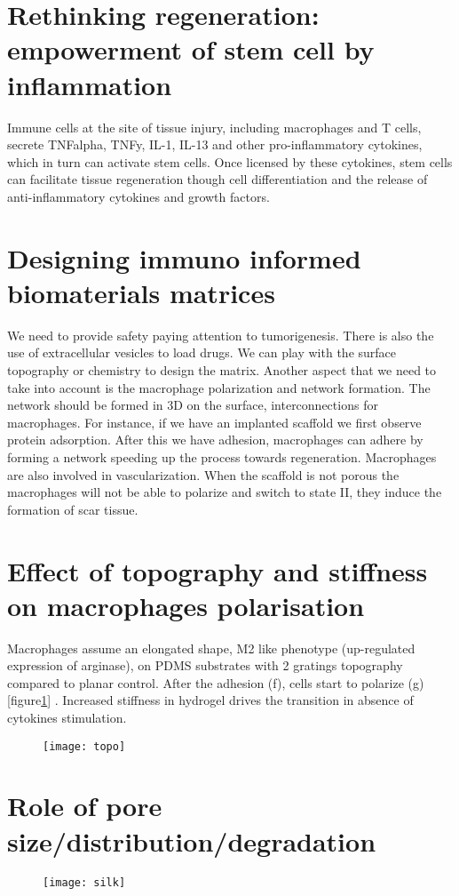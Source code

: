 \section{Rethinking regeneration: empowerment of stem cell by inflammation}
Immune cells at the site of tissue injury, including macrophages and T cells, secrete TNFalpha, TNFy, IL-1, IL-13 and other pro-inflammatory cytokines, which in turn can activate stem cells. 
Once licensed by these cytokines, stem cells can facilitate tissue regeneration though cell differentiation and the release of anti-inflammatory cytokines and growth factors.

\section{Designing immuno informed biomaterials matrices}
We need to provide safety paying attention to tumorigenesis.
There is also the use of extracellular vesicles to load drugs.
We can play with the surface topography or chemistry to design the matrix.
Another aspect that we need to take into account is the macrophage polarization and network formation.
The network should be formed in 3D on the surface, interconnections for macrophages.
For instance, if we have an implanted scaffold we first observe protein adsorption. 
After this we have adhesion, macrophages can adhere by forming a network speeding up the process towards regeneration. 
Macrophages are also involved in vascularization. 
When the scaffold is not porous the macrophages will not be able to polarize and switch to state II, they induce the formation of scar tissue.

\section{Effect of topography and stiffness on macrophages polarisation}
Macrophages assume an elongated shape, M2 like phenotype (up-regulated expression of arginase), on PDMS substrates with 2 gratings topography compared to planar control.
After the adhesion (f), cells start to polarize (g) [figure\ref{fig:topo}] .  Increased stiffness in hydrogel drives the transition in absence of cytokines stimulation. 

\begin{figure}[h]
\texttt{[image: topo]}
\caption{\label{fig:topo}}
\end{figure}

\section{Role of pore size/distribution/degradation}
\begin{figure}[h]
\texttt{[image: silk]}
\caption{\label{fig:silk}}
\end{figure}

